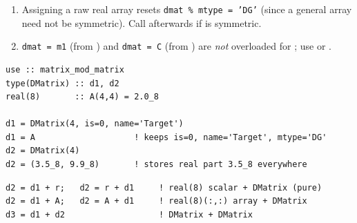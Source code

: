 \begin{warnbox}
\begin{enumerate}
  \item Assigning a raw real array  resets \texttt{dmat \% mtype = 'DG'} (since a general array need not be symmetric). Call  afterwards if  is symmetric.
  \item \texttt{dmat = m1} (from ) and \texttt{dmat = C} (from ) are \emph{not} overloaded for ; use  or .
\end{enumerate}
\end{warnbox}

\begin{description}[leftmargin=2.2cm, style=nextline]
\end{description}

\lstset{language=[95]Fortran}
\begin{lstlisting}
use :: matrix_mod_matrix
type(DMatrix) :: d1, d2
real(8)       :: A(4,4) = 2.0_8

d1 = DMatrix(4, is=0, name='Target')
d1 = A                    ! keeps is=0, name='Target', mtype='DG'
d2 = DMatrix(4)
d2 = (3.5_8, 9.9_8)       ! stores real part 3.5_8 everywhere
\end{lstlisting}



\lstset{language=[95]Fortran}
\begin{lstlisting}
d2 = d1 + r;   d2 = r + d1     ! real(8) scalar + DMatrix (pure)
d2 = d1 + A;   d2 = A + d1     ! real(8)(:,:) array + DMatrix
d3 = d1 + d2                   ! DMatrix + DMatrix
\end{lstlisting}

